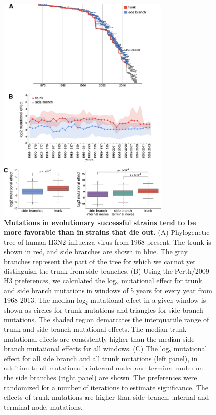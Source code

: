 \documentclass[11pt]{article}
\begin{document}
\begin{figure}
\centerline{\includegraphics[width=0.75\textwidth]{figs/trunkvssidebranch/trunkvssidebranch.pdf}}
\caption{\label{fig:trunkvssidebranch}
{\bf Mutations in evolutionary successful strains tend to be more favorable than in strains that die out.}
(A) Phylogenetic tree of human H3N2 influenza virus from 1968-present. 
The trunk is shown in red, and side branches are shown in blue.
The gray branches represent the part of the tree for which we cannot yet distinguish the trunk from side branches.
(B) Using the Perth/2009 H3 preferences, we calculated the log$_{2}$ mutational effect for trunk and side branch mutations in windows of 5 years for every year from 1968-2013. 
The median log$_{2}$ mutational effect in a given window is shown as circles for trunk mutations and triangles for side branch mutations. 
The shaded region demarcates the interquartile range of trunk and side branch mutational effects.
The median trunk mutational effects are consistently higher than the median side branch mutational effects for all windows.
(C) The log$_{2}$ mutational effect for all side branch and all trunk mutations (left panel), in addition to all mutations in internal nodes and terminal nodes on the side branches (right panel) are shown.
The preferences were randomized for a number of iterations to estimate significance.
The effects of trunk mutations are higher than side branch, internal and terminal node, mutations.
}
\end{figure}
\end{document}
